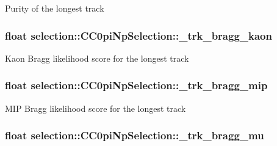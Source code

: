 Purity of the longest track \hypertarget{classselection_1_1CC0piNpSelection_ac9b23583581239191762cfb60307fb78}{
\subsubsection[{\-\_\-trk\-\_\-bragg\-\_\-kaon}]{\setlength{\rightskip}{0pt plus 5cm}float selection\-::\-C\-C0pi\-Np\-Selection\-::\-\_\-trk\-\_\-bragg\-\_\-kaon\hspace{0.3cm}{\ttfamily [private]}}}\label{classselection_1_1CC0piNpSelection_ac9b23583581239191762cfb60307fb78}
Kaon Bragg likelihood score for the longest track \hypertarget{classselection_1_1CC0piNpSelection_aec1e4d27216773ec40bc66ab5c217abc}{
\subsubsection[{\-\_\-trk\-\_\-bragg\-\_\-mip}]{\setlength{\rightskip}{0pt plus 5cm}float selection\-::\-C\-C0pi\-Np\-Selection\-::\-\_\-trk\-\_\-bragg\-\_\-mip\hspace{0.3cm}{\ttfamily [private]}}}\label{classselection_1_1CC0piNpSelection_aec1e4d27216773ec40bc66ab5c217abc}
M\-I\-P Bragg likelihood score for the longest track \hypertarget{classselection_1_1CC0piNpSelection_a9e7b081beb0ef9129f15a7fb965276f1}{
\subsubsection[{\-\_\-trk\-\_\-bragg\-\_\-mu}]{\setlength{\rightskip}{0pt plus 5cm}float selection\-::\-C\-C0pi\-Np\-Selection\-::\-\_\-trk\-\_\-bragg\-\_\-mu\hspace{0.3cm}{\ttfamily [private]}}}\label{classselection_1_1CC0piNpSelection_a9e7b081beb0ef9129f15a7fb965276f1}
